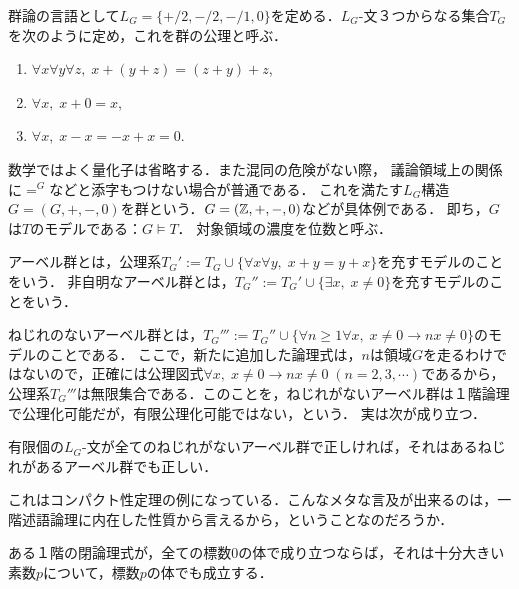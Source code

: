 \documentclass[uplatex, 12pt, dvipdfmx]{jsreport}
\begin{document}
\begin{example}[群論]
    群論の言語として$L_G=\{+/2,-/2,-/1,0\}$を定める．$L_G$-文３つからなる集合$T_G$を次のように定め，これを群の公理と呼ぶ．
    \begin{enumerate}
        \item $\forall x\forall y\forall z,\;x+(y+z)=(z+y)+z$,
        \item $\forall x,\; x+0=x$,
        \item $\forall x,\; x-x=-x+x=0$.
    \end{enumerate}
    数学ではよく量化子は省略する．また混同の危険がない際，
    議論領域上の関係に$=^G$などと添字もつけない場合が普通である．
    これを満たす$L_G$構造$G=(G,+,-,0)$を群という．$G=(\mathbb{Z},+,-,0)$などが具体例である．
    即ち，$G$は$T$のモデルである：$G \vDash T$．
    対象領域の濃度を位数と呼ぶ．

    アーベル群とは，公理系$T_G':=T_G\cup\{\forall x\forall y,\;x+y=y+x\}$を充すモデルのことをいう．
    非自明なアーベル群とは，$T_G'':=T_G'\cup\{\exists x,\;x\ne 0\}$を充すモデルのことをいう．

    ねじれのないアーベル群とは，$T_G''':=T_G''\cup\{\forall n\ge 1\forall x,\; x\ne 0\rightarrow nx\ne 0\}$のモデルのことである．
    ここで，新たに追加した論理式は，$n$は領域$G$を走るわけではないので，正確には公理図式$\forall x,\; x\ne 0\rightarrow nx\ne 0\;(n=2,3,\cdots)$であるから，
    公理系$T_G'''$は無限集合である．このことを，ねじれがないアーベル群は１階論理で公理化可能だが，有限公理化可能ではない，という．
    実は次が成り立つ．
    \begin{proposition}[Compactness]
        有限個の$L_G$-文が全てのねじれがないアーベル群で正しければ，それはあるねじれがあるアーベル群でも正しい．
    \end{proposition}
    \begin{remark}
        これはコンパクト性定理の例になっている．こんなメタな言及が出来るのは，一階述語論理に内在した性質から言えるから，ということなのだろうか．
    \end{remark}
\end{example}

\begin{example}[体]
    \begin{proposition}[Compactness]
        ある１階の閉論理式が，全ての標数$0$の体で成り立つならば，それは十分大きい素数$p$について，標数$p$の体でも成立する．
    \end{proposition}
\end{example}
\end{document}
